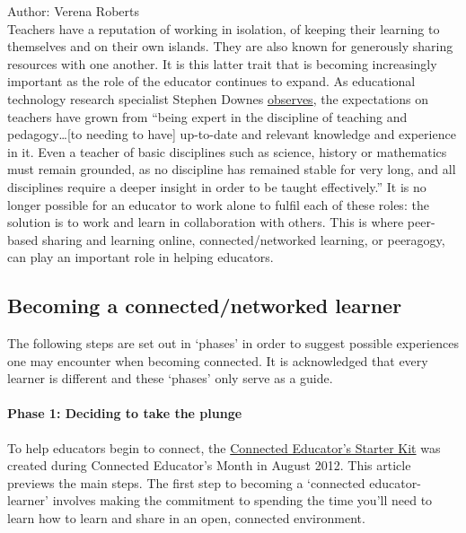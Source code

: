 Author: Verena Roberts \\

Teachers have a reputation of working in
isolation, of keeping their learning to themselves and on their own
islands. They are also known for generously sharing resources with one
another. It is this latter trait that is becoming increasingly important
as the role of the educator continues to expand. As educational
technology research specialist Stephen Downes
\href{http://www.huffingtonpost.com/stephen-downes/the-role-of-the-educator\_b\_790937.html}{observes},
the expectations on teachers have grown from ``being expert in the
discipline of teaching and pedagogy\ldots{}{[}to needing to have{]}
up-to-date and relevant knowledge and experience in it. Even a teacher
of basic disciplines such as science, history or mathematics must remain
grounded, as no discipline has remained stable for very long, and all
disciplines require a deeper insight in order to be taught
effectively.'' It is no longer possible for an educator to work alone to
fulfil each of these roles: the solution is to work and learn in
collaboration with others. This is where peer-based sharing and learning
online, connected/networked learning, or peeragogy, can play an
important role in helping educators.

\subsection{Becoming a connected/networked learner}

The following steps are set out in `phases' in order to suggest possible
experiences one may encounter when becoming connected. It is
acknowledged that every learner is different and these `phases' only
serve as a guide.

\paragraph{Phase 1: Deciding to take the plunge}

To help educators begin to connect, the
\href{http://www.google.com/url?q=https\%3A\%2F\%2Fdl.dropbox.com\%2Fu\%2F38904447\%2Fstarter-kit-final.pdf\&sa=D\&sntz=1\&usg=AFQjCNE9sNo1Lz9-zJ0KH48djXeYVoAF4A}{Connected
Educator's Starter Kit} was created during Connected Educator's Month in
August 2012. This article previews the main steps. The first step to
becoming a `connected educator-learner' involves making the commitment
to spending the time you'll need to learn how to learn and share in an
open, connected environment.

